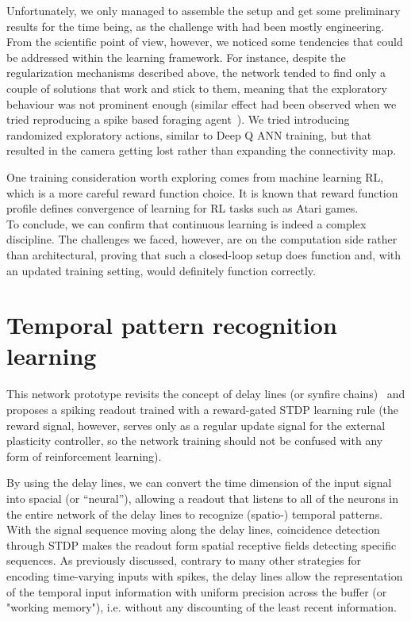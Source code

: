 Unfortunately, we only managed to assemble the setup and get some preliminary results for the time being, as the challenge with had been mostly engineering. From the scientific point of view, however, we noticed some tendencies that could be addressed within the learning framework. For instance, despite the regularization mechanisms described above, the network tended to find only a couple of solutions that work and stick to them, meaning that the exploratory behaviour was not prominent enough (similar effect had been observed when we tried reproducing a spike based foraging agent~\cite{Sanda_etal17}). We tried introducing randomized exploratory actions, similar to Deep Q ANN training, but that resulted in the camera getting lost rather than expanding the connectivity map.

One training consideration worth exploring comes from machine learning RL, which is a more careful reward function choice. It is known that reward function profile defines convergence of learning for RL tasks such as Atari games.\\

To conclude, we can confirm that continuous learning is indeed a complex discipline. The challenges we faced, however, are on the computation side rather than architectural, proving that such a closed-loop setup does function and, with an updated training setting, would definitely function correctly.

\newpage
\section{Temporal pattern recognition learning}
\label{sec:delay_lines}

This network prototype revisits the concept of delay lines (or synfire chains)~\cite{Abeles91, Diesmann_etal99, Cariani_etal22} and proposes a spiking readout trained with a reward-gated STDP learning rule (the reward signal, however, serves only as a regular update signal for the external plasticity controller, so the network training should not be confused with any form of reinforcement learning).

By using the delay lines, we can convert the time dimension of the input signal into spacial (or ``neural''), allowing a readout that listens to all of the neurons in the entire network of the delay lines to recognize (spatio-) temporal patterns. With the signal sequence moving along the delay lines, coincidence detection through STDP makes the readout form spatial receptive fields detecting specific sequences. As previously discussed, contrary to many other strategies for encoding time-varying inputs with spikes, the delay lines allow the representation of the temporal input information with uniform precision across the buffer (or "working memory"), i.e. without any discounting of the least recent information.

